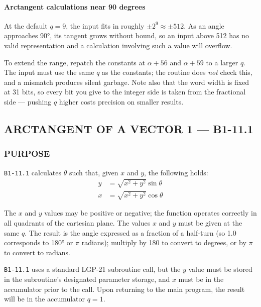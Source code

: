 \paragraph{Arctangent calculations near 90 degrees}
At the default $q=9$, the input fits in roughly $\pm 2^9 \approx \pm 512$. As an angle approaches 90°, its tangent grows without bound, so an input above 512 has no valid representation and a calculation involving such a value will overflow.

To extend the range, repatch the constants at $\alpha+56$ and $\alpha+59$ to a larger $q$. The input must use the same $q$ as the constants; the routine does \emph{not} check this, and a mismatch produces silent garbage. Note also that the word width is fixed at 31 bits, so every bit you give to the integer side is taken from the fractional side --- pushing $q$ higher costs precision on smaller results.

\newpage

\subsection*{ARCTANGENT OF A VECTOR 1 --- B1-11.1}
\label{sec:vector_evolution_of_arctangent_1}

\subsubsection*{PURPOSE}
\texttt{B1-11.1} calculates $\theta$ such that, given $x$ and $y$, the following holds:
\begin{align}
    y &= \sqrt{x^2 + y^2} \sin \theta \\
    x &= \sqrt{x^2 + y^2} \cos \theta
\end{align}

The $x$ and $y$ values may be positive or negative; the function operates correctly in all quadrants of the cartesian plane. The values $x$ and $y$ must be given at the same $q$. The result is the angle expressed as a fraction of a half-turn (so 1.0 corresponds to 180° or $\pi$ radians); multiply by 180 to convert to degrees, or by $\pi$ to convert to radians.

\texttt{B1-11.1} uses a standard LGP-21 subroutine call, but the $y$ value must be stored in the subroutine's designated parameter storage, and $x$ must be in the accumulator prior to the call. Upon returning to the main program, the result will be in the accumulator $q=1$.

